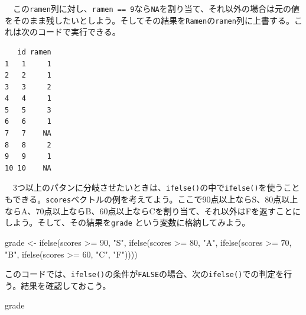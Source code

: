 \documentclass[
  a4paper,
  pandoc,
  ja=standard,
  jafont=haranoaji]{bxjsbook}
\newenvironment{Shaded}{\begin{snugshade}}{\end{snugshade}}
\newcommand{\ConstantTok}[1]{\textcolor[rgb]{0.56,0.35,0.01}{#1}}
\newcommand{\DecValTok}[1]{\textcolor[rgb]{0.68,0.00,0.00}{#1}}
\newcommand{\FunctionTok}[1]{\textcolor[rgb]{0.28,0.35,0.67}{#1}}
\newcommand{\NormalTok}[1]{\textcolor[rgb]{0.00,0.48,0.65}{#1}}
\newcommand{\OtherTok}[1]{\textcolor[rgb]{0.00,0.48,0.65}{#1}}
\newcommand{\SpecialCharTok}[1]{\textcolor[rgb]{0.37,0.37,0.37}{#1}}
\newcommand{\StringTok}[1]{\textcolor[rgb]{0.13,0.47,0.30}{#1}}
\begin{document}
　この\texttt{ramen}列に対し、\texttt{ramen\ ==\ 9}なら\texttt{NA}を割り当て、それ以外の場合は元の値をそのまま残したいとしよう。そしてその結果を\texttt{Ramen}の\texttt{ramen}列に上書する。これは次のコードで実行できる。

\begin{Shaded}
\end{Shaded}

\begin{verbatim}
   id ramen
1   1     1
2   2     1
3   3     2
4   4     1
5   5     3
6   6     1
7   7    NA
8   8     2
9   9     1
10 10    NA
\end{verbatim}

　3つ以上のパタンに分岐させたいときは、\texttt{ifelse()}の中で\texttt{ifelse()}を使うこともできる。\texttt{scores}ベクトルの例を考えてよう。ここで90点以上ならS、80点以上ならA、70点以上ならB、60点以上ならCを割り当て、それ以外はFを返すことにしよう。そして、その結果を\texttt{grade}
という変数に格納してみよう。

\begin{Shaded}
\begin{Highlighting}[numbers=left,,]
\NormalTok{grade }\OtherTok{\textless{}{-}} \FunctionTok{ifelse}\NormalTok{(scores }\SpecialCharTok{\textgreater{}=} \DecValTok{90}\NormalTok{, }\StringTok{"S"}\NormalTok{, }
                \FunctionTok{ifelse}\NormalTok{(scores }\SpecialCharTok{\textgreater{}=} \DecValTok{80}\NormalTok{, }\StringTok{"A"}\NormalTok{,}
                       \FunctionTok{ifelse}\NormalTok{(scores }\SpecialCharTok{\textgreater{}=} \DecValTok{70}\NormalTok{, }\StringTok{"B"}\NormalTok{,}
                              \FunctionTok{ifelse}\NormalTok{(scores }\SpecialCharTok{\textgreater{}=} \DecValTok{60}\NormalTok{, }\StringTok{"C"}\NormalTok{, }\StringTok{"F"}\NormalTok{))))}
\end{Highlighting}
\end{Shaded}

このコードでは、\texttt{ifelse()}の条件が\texttt{FALSE}の場合、次の\texttt{ifelse()}での判定を行う。結果を確認しておこう。

\begin{Shaded}
\begin{Highlighting}[numbers=left,,]
\NormalTok{grade}
\end{Highlighting}
\end{Shaded}
\end{document}
